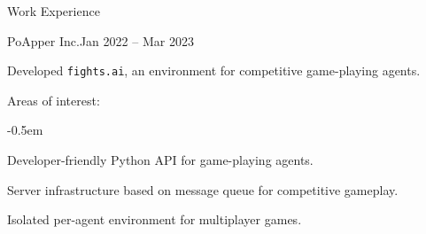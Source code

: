 \documentclass{resume}
\begin{document}
\begin{res-section}{Work Experience}
\begin{res-subsection}{PoApper Inc.}{Jan 2022 -- Mar 2023}
    \item Developed \texttt{fights.ai}, an environment for competitive game-playing agents.

    \item Areas of interest:
    \vspace{-0.5em}
    \begin{list}{--}{}
      \itemsep -0.5em
      \item Developer-friendly Python API for game-playing agents.
      \item Server infrastructure based on message queue for competitive gameplay.
      \item Isolated per-agent environment for multiplayer games.
    \end{list}
  \end{res-subsection}
\end{res-section}
\end{document}
